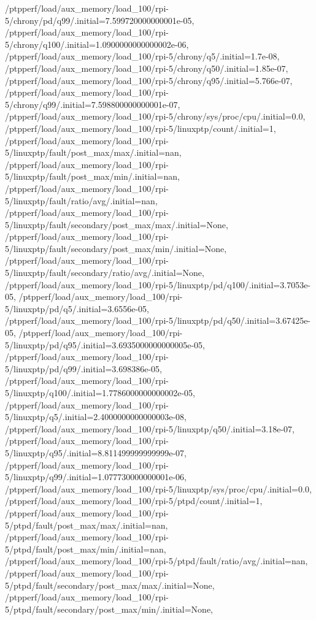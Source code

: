 {    /ptpperf/load/aux_memory/load_100/rpi-5/chrony/pd/q99/.initial=7.599720000000001e-05,
    /ptpperf/load/aux_memory/load_100/rpi-5/chrony/q100/.initial=1.0900000000000002e-06,
    /ptpperf/load/aux_memory/load_100/rpi-5/chrony/q5/.initial=1.7e-08,
    /ptpperf/load/aux_memory/load_100/rpi-5/chrony/q50/.initial=1.85e-07,
    /ptpperf/load/aux_memory/load_100/rpi-5/chrony/q95/.initial=5.766e-07,
    /ptpperf/load/aux_memory/load_100/rpi-5/chrony/q99/.initial=7.598800000000001e-07,
    /ptpperf/load/aux_memory/load_100/rpi-5/chrony/sys/proc/cpu/.initial=0.0,
    /ptpperf/load/aux_memory/load_100/rpi-5/linuxptp/count/.initial=1,
    /ptpperf/load/aux_memory/load_100/rpi-5/linuxptp/fault/post_max/max/.initial=nan,
    /ptpperf/load/aux_memory/load_100/rpi-5/linuxptp/fault/post_max/min/.initial=nan,
    /ptpperf/load/aux_memory/load_100/rpi-5/linuxptp/fault/ratio/avg/.initial=nan,
    /ptpperf/load/aux_memory/load_100/rpi-5/linuxptp/fault/secondary/post_max/max/.initial=None,
    /ptpperf/load/aux_memory/load_100/rpi-5/linuxptp/fault/secondary/post_max/min/.initial=None,
    /ptpperf/load/aux_memory/load_100/rpi-5/linuxptp/fault/secondary/ratio/avg/.initial=None,
    /ptpperf/load/aux_memory/load_100/rpi-5/linuxptp/pd/q100/.initial=3.7053e-05,
    /ptpperf/load/aux_memory/load_100/rpi-5/linuxptp/pd/q5/.initial=3.6556e-05,
    /ptpperf/load/aux_memory/load_100/rpi-5/linuxptp/pd/q50/.initial=3.67425e-05,
    /ptpperf/load/aux_memory/load_100/rpi-5/linuxptp/pd/q95/.initial=3.6935000000000005e-05,
    /ptpperf/load/aux_memory/load_100/rpi-5/linuxptp/pd/q99/.initial=3.698386e-05,
    /ptpperf/load/aux_memory/load_100/rpi-5/linuxptp/q100/.initial=1.7786000000000002e-05,
    /ptpperf/load/aux_memory/load_100/rpi-5/linuxptp/q5/.initial=2.4000000000000003e-08,
    /ptpperf/load/aux_memory/load_100/rpi-5/linuxptp/q50/.initial=3.18e-07,
    /ptpperf/load/aux_memory/load_100/rpi-5/linuxptp/q95/.initial=8.811499999999999e-07,
    /ptpperf/load/aux_memory/load_100/rpi-5/linuxptp/q99/.initial=1.077730000000001e-06,
    /ptpperf/load/aux_memory/load_100/rpi-5/linuxptp/sys/proc/cpu/.initial=0.0,
    /ptpperf/load/aux_memory/load_100/rpi-5/ptpd/count/.initial=1,
    /ptpperf/load/aux_memory/load_100/rpi-5/ptpd/fault/post_max/max/.initial=nan,
    /ptpperf/load/aux_memory/load_100/rpi-5/ptpd/fault/post_max/min/.initial=nan,
    /ptpperf/load/aux_memory/load_100/rpi-5/ptpd/fault/ratio/avg/.initial=nan,
    /ptpperf/load/aux_memory/load_100/rpi-5/ptpd/fault/secondary/post_max/max/.initial=None,
    /ptpperf/load/aux_memory/load_100/rpi-5/ptpd/fault/secondary/post_max/min/.initial=None,
}
